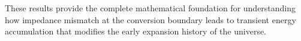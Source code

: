 These results provide the complete mathematical foundation for understanding how impedance mismatch at the conversion boundary leads to transient energy accumulation that modifies the early expansion history of the universe.

